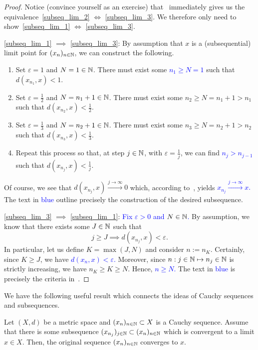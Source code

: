 \begin{proof}
Notice (convince yourself as an exercise) that~ immediately gives us the equivalence~\ref{subseq_lim_2} $\iff$ \ref{subseq_lim_3}. We therefore only need to show~\ref{subseq_lim_1} $\iff$ \ref{subseq_lim_3}.

\ref{subseq_lim_1} $\implies$ \ref{subseq_lim_3}: By assumption that $x$ is a (subsequential) limit point for $(x_n)_{n\in\mathbb{N}}$, we can construct the following.
\begin{enumerate}
	\item Set $\varepsilon = 1$ and $N = 1\in \mathbb{N}$. There must exist some \textcolor{blue}{$n_1 \ge N = 1$} such that $d(x_{n_1},x)<1$.
	\item Set $\varepsilon = \frac{1}{2}$ and $N = n_1 + 1 \in \mathbb{N}$. There must exist some $n_2 \ge N = n_1+1 > n_1$ such that $d(x_{n_2},x)<\frac{1}{2}$.
	\item Set $\varepsilon = \frac{1}{3}$ and $N = n_2 + 1\in\mathbb{N}$. There must exist some $n_3 \ge N = n_2 + 1 > n_2$ such that $d(x_{n_3},x)<\frac{1}{3}$.
	\item Repeat this process so that, at step $j\in\mathbb{N}$, with $\varepsilon = \frac{1}{j}$, we can find \textcolor{blue}{$n_j > n_{j-1}$} such that $d(x_{n_j},x)<\frac{1}{j}$.
\end{enumerate}
Of course, we see that $d(x_{n_j},x)\overset{j\to \infty}{\to} 0$ which, according to~, yields \textcolor{blue}{$x_{n_j}\overset{j\to \infty}{\to} x$.} The text in \textcolor{blue}{blue} outline precisely the construction of the desired subsequence.

\ref{subseq_lim_3} $\implies$ \ref{subseq_lim_1}: \textcolor{blue}{Fix $\varepsilon>0$ and $N\in\mathbb{N}$.} By assumption, we know that there exists some $J\in\mathbb{N}$ such that
\[
j\ge J \implies d(x_{n_j},x)<\varepsilon.
\]
In particular, let us define $K = \max(J,N)$ and consider $n:=n_K$. Certainly, since $K \ge J$, we have \textcolor{blue}{$d(x_n,x)<\varepsilon$.} Moreover, since $n:j\in \mathbb{N} \mapsto n_j\in\mathbb{N}$ is strictly increasing, we have $n_K \ge K \ge N$. Hence, \textcolor{blue}{$n\ge N$.} The text in \textcolor{blue}{blue} is precisely the criteria in~.
\end{proof}
We have the following useful result which connects the ideas of Cauchy sequences and subsequences.
\begin{lemma}
\label{lem:cauchy_sub_cvg}
Let $(X,d)$ be a metric space and $(x_n)_{n\in\mathbb{N}}\subset X$ is a Cauchy sequence. Assume that there is some subsequence $(x_{n_j})_{j\in\mathbb{N}}\subset (x_n)_{n\in\mathbb{N}}$ which is convergent to a limit $x\in X$. Then, the original sequence $(x_n)_{n\in\mathbb{N}}$ converges to $x$.
\end{lemma}
